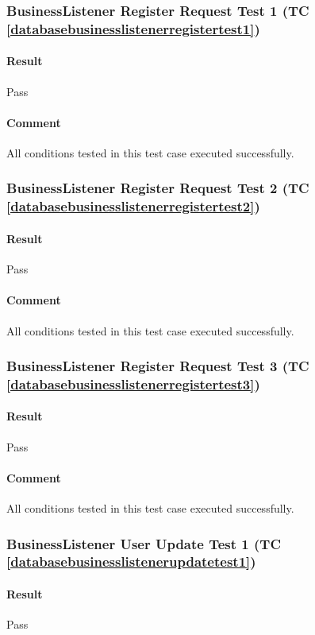 \documentclass[hidelinks,english]{article}
\begin{document}
			\subsubsection{BusinessListener Register Request Test 1 (TC \ref{databasebusinesslistenerregistertest1})}
				\paragraph{Result} Pass
				\paragraph{Comment} All conditions tested in this test case executed successfully.
				
			\subsubsection{BusinessListener Register Request Test 2 (TC \ref{databasebusinesslistenerregistertest2})}
				\paragraph{Result} Pass
				\paragraph{Comment} All conditions tested in this test case executed successfully.
				
			\subsubsection{BusinessListener Register Request Test 3 (TC \ref{databasebusinesslistenerregistertest3})}
				\paragraph{Result} Pass
				\paragraph{Comment} All conditions tested in this test case executed successfully.
				
			\subsubsection{BusinessListener User Update Test 1 (TC \ref{databasebusinesslistenerupdatetest1})}
				\paragraph{Result} Pass
\end{document}
